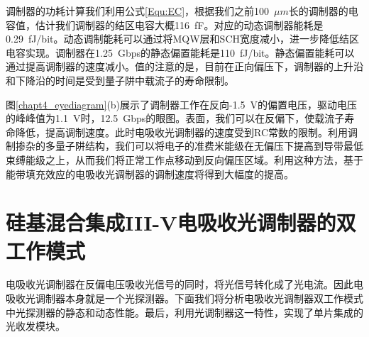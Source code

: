 调制器的功耗计算我们利用公式\ref{Equ:EC}，根据我们之前100~$\mu m$长的调制器的电容值\cite{fu20155}，估计我们调制器的结区电容大概116~fF。对应的动态调制器能耗是0.29~fJ/bit。动态调制能耗可以通过将MQW层和SCH宽度减小，进一步降低结区电容实现。调制器在1.25~Gbps的静态偏置能耗是110~fJ/bit。静态偏置能耗可以通过提高调制器的速度减小。值的注意的是，目前在正向偏压下，调制器的上升沿和下降沿的时间是受到量子阱中载流子的寿命限制。

图\ref{chapt4_eyediagram}(b)展示了调制器工作在反向-1.5~V的偏置电压，驱动电压的峰峰值为1.1~V时，12.5~Gbps的眼图。表面，我们可以在反偏下，使载流子寿命降低，提高调制速度。此时电吸收光调制器的速度受到RC常数的限制。利用调制掺杂的多量子阱结构，我们可以将电子的准费米能级在无偏压下提高到导带最低束缚能级之上，从而我们将正常工作点移动到反向偏压区域\cite{livescu1988free,kalinovsky1993free}。利用这种方法，基于能带填充效应的电吸收光调制器的调制速度将得到大幅度的提高。

\section{硅基混合集成III-V电吸收光调制器的双工作模式}
电吸收光调制器在反偏电压吸收光信号的同时，将光信号转化成了光电流。因此电吸收光调制器本身就是一个光探测器。下面我们将分析电吸收光调制器双工作模式中光探测器的静态和动态性能。最后，利用光调制器这一特性，实现了单片集成的光收发模块。
